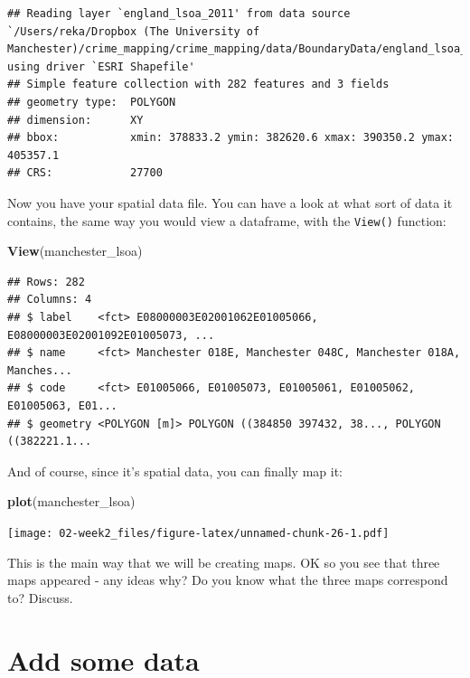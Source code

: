 \documentclass[]{book}
\newenvironment{Shaded}{\begin{snugshade}}{\end{snugshade}}
\newcommand{\KeywordTok}[1]{\textcolor[rgb]{0.13,0.29,0.53}{\textbf{#1}}}
\newcommand{\NormalTok}[1]{#1}
\begin{document}
\begin{verbatim}
## Reading layer `england_lsoa_2011' from data source `/Users/reka/Dropbox (The University of Manchester)/crime_mapping/crime_mapping/data/BoundaryData/england_lsoa_2011.shp' using driver `ESRI Shapefile'
## Simple feature collection with 282 features and 3 fields
## geometry type:  POLYGON
## dimension:      XY
## bbox:           xmin: 378833.2 ymin: 382620.6 xmax: 390350.2 ymax: 405357.1
## CRS:            27700
\end{verbatim}

Now you have your spatial data file. You can have a look at what sort of data it contains, the same way you would view a dataframe, with the \texttt{View()} function:

\begin{Shaded}
\begin{Highlighting}[]
\KeywordTok{View}\NormalTok{(manchester_lsoa)}
\end{Highlighting}
\end{Shaded}

\begin{verbatim}
## Rows: 282
## Columns: 4
## $ label    <fct> E08000003E02001062E01005066, E08000003E02001092E01005073, ...
## $ name     <fct> Manchester 018E, Manchester 048C, Manchester 018A, Manches...
## $ code     <fct> E01005066, E01005073, E01005061, E01005062, E01005063, E01...
## $ geometry <POLYGON [m]> POLYGON ((384850 397432, 38..., POLYGON ((382221.1...
\end{verbatim}

And of course, since it's spatial data, you can finally map it:

\begin{Shaded}
\begin{Highlighting}[]
\KeywordTok{plot}\NormalTok{(manchester_lsoa)}
\end{Highlighting}
\end{Shaded}

\texttt{[image: 02-week2\_files/figure-latex/unnamed-chunk-26-1.pdf]}

This is the main way that we will be creating maps. OK so you see that three maps appeared - any ideas why? Do you know what the three maps correspond to? Discuss.

\hypertarget{add-some-data}{%
\section{Add some data}\label{add-some-data}}
\end{document}
